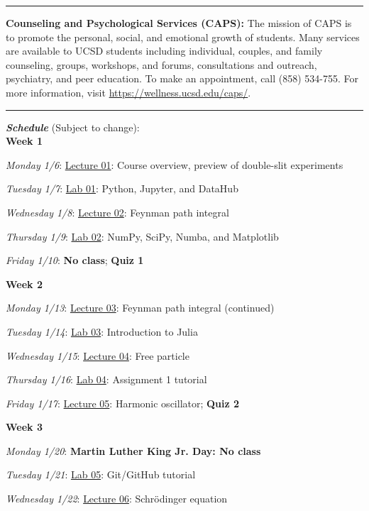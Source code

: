 \documentclass[12pt]{article}
\begin{document}
\begin{center}
  \rule{\textwidth}{0.5pt}
\end{center}

\noindent\textbf{Counseling and Psychological Services (CAPS):} The mission of CAPS is to promote the personal, social, and emotional growth of students.
Many services are available to UCSD students including individual, couples, and family counseling, groups, workshops, and forums, consultations and outreach, psychiatry, and peer education.
To make an appointment, call (858) 534-755.
For more information, visit \href{https://wellness.ucsd.edu/caps/}{https://wellness.ucsd.edu/caps/}.

\begin{center}
  \rule{\textwidth}{0.5pt}
\end{center}

\noindent\textbf{\emph{Schedule}} (Subject to change):\\

\noindent\textbf{Week 1}

\emph{Monday 1/6}: \underline{Lecture 01}: Course overview, preview of double-slit experiments

\emph{Tuesday 1/7}: \underline{Lab 01}: Python, Jupyter, and DataHub

\emph{Wednesday 1/8}: \underline{Lecture 02}: Feynman path integral

\emph{Thursday 1/9}: \underline{Lab 02}: NumPy, SciPy, Numba, and Matplotlib

\emph{Friday 1/10}: \textbf{No class}; \textbf{Quiz 1}

\noindent\textbf{Week 2}

\emph{Monday 1/13}: \underline{Lecture 03}: Feynman path integral (continued)

\emph{Tuesday 1/14}: \underline{Lab 03}: Introduction to Julia

\emph{Wednesday 1/15}: \underline{Lecture 04}: Free particle

\emph{Thursday 1/16}: \underline{Lab 04}: Assignment 1 tutorial

\emph{Friday 1/17}: \underline{Lecture 05}: Harmonic oscillator; \textbf{Quiz 2}

\noindent\textbf{Week 3}

\emph{Monday 1/20}: \textbf{Martin Luther King Jr. Day: No class}

\emph{Tuesday 1/21}: \underline{Lab 05}: Git/GitHub tutorial

\emph{Wednesday 1/22}: \underline{Lecture 06}: Schr\"{o}dinger equation
\end{document}
